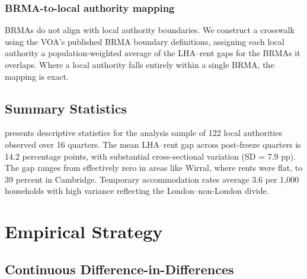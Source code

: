 \documentclass[12pt]{article}
\begin{document}
\subsubsection*{BRMA-to-local authority mapping} BRMAs do not align with local authority boundaries. We construct a crosswalk using the VOA's published BRMA boundary definitions, assigning each local authority a population-weighted average of the LHA--rent gaps for the BRMAs it overlaps. Where a local authority falls entirely within a single BRMA, the mapping is exact.

\subsection{Summary Statistics}



 presents descriptive statistics for the analysis sample of 122 local authorities observed over 16 quarters. The mean LHA--rent gap across post-freeze quarters is 14.2 percentage points, with substantial cross-sectional variation (SD = 7.9 pp). The gap ranges from effectively zero in areas like Wirral, where rents were flat, to 39 percent in Cambridge. Temporary accommodation rates average 3.6 per 1,000 households with high variance reflecting the London--non-London divide.


\section{Empirical Strategy}

\subsection{Continuous Difference-in-Differences}
\end{document}
